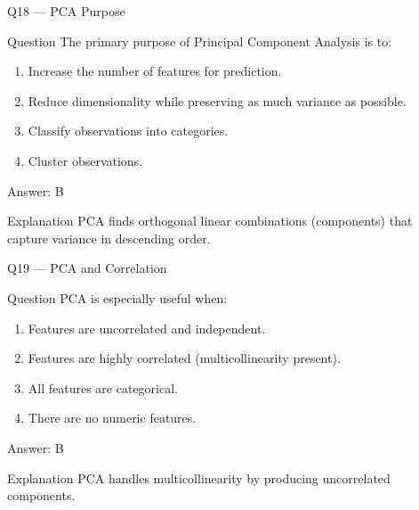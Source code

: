 \documentclass[aspectratio=169,8pt]{beamer}
\begin{document}
	\begin{frame}{Q18 --- PCA Purpose}
		\begin{block}{Question}
			The primary purpose of Principal Component Analysis is to:
		\end{block}
		\begin{enumerate}
			\item Increase the number of features for prediction.
			\item Reduce dimensionality while preserving as much variance as possible.
			\item Classify observations into categories.
			\item Cluster observations.
		\end{enumerate}
		\begin{exampleblock}{Answer: B}\end{exampleblock}
		\begin{block}{Explanation}
			PCA finds orthogonal linear combinations (components) that capture variance in descending order.
		\end{block}
	\end{frame}
	
	\begin{frame}{Q19 --- PCA and Correlation}
		\begin{block}{Question}
			PCA is especially useful when:
		\end{block}
		\begin{enumerate}
			\item Features are uncorrelated and independent.
			\item Features are highly correlated (multicollinearity present).
			\item All features are categorical.
			\item There are no numeric features.
		\end{enumerate}
		\begin{exampleblock}{Answer: B}\end{exampleblock}
		\begin{block}{Explanation}
			PCA handles multicollinearity by producing uncorrelated components.
		\end{block}
	\end{frame}
	
\end{document}
